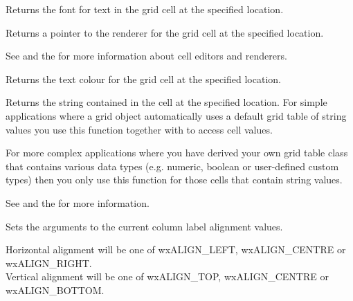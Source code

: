 
Returns the font for text in the grid cell at the specified location.

\label{wxgridgetcellrenderer}


Returns a pointer to the renderer for the grid cell at the specified location.

See  and
the  for more information about cell editors and renderers.

\label{wxgridgetcelltextcolour}


Returns the text colour for the grid cell at the specified location.

\label{wxgridgetcellvalue}



Returns the string contained in the cell at the specified location. For simple applications where a
grid object automatically uses a default grid table of string values you use this function together
with  to access cell values. 

For more complex applications where you have derived your own grid table class that contains
various data types (e.g. numeric, boolean or user-defined custom types) then you only use this
function for those cells that contain string values. 

See 
and the  for more information.

\label{wxgridgetcollabelalignment}


Sets the arguments to the current column label alignment values.

Horizontal alignment will be one of wxALIGN\_LEFT, wxALIGN\_CENTRE or wxALIGN\_RIGHT.\\
Vertical alignment will be one of wxALIGN\_TOP, wxALIGN\_CENTRE or wxALIGN\_BOTTOM.

